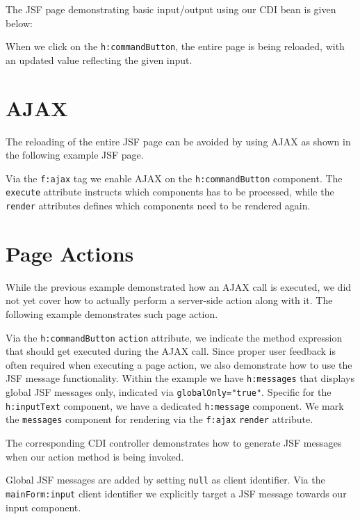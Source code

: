 The JSF page demonstrating basic input/output using our CDI bean is given below:

When we click on the \texttt{h:commandButton}, the entire page is being reloaded, with an updated value reflecting the given input.


\section{AJAX}

The reloading of the entire JSF page can be avoided by using AJAX as shown in the following example JSF page.

Via the \texttt{f:ajax} tag we enable AJAX on the \texttt{h:commandButton} component.
The \texttt{execute} attribute instructs which components has to be processed, while the \texttt{render} attributes defines which components need to be rendered again.


\section{Page Actions}
While the previous example demonstrated how an AJAX call is executed, we did not yet cover how to actually perform a server-side action along with it.
The following example demonstrates such page action.

Via the \texttt{h:commandButton} \texttt{action} attribute, we indicate the method expression that should get executed during the AJAX call.
Since proper user feedback is often required when executing a page action, we also demonstrate how to use the JSF message functionality.
Within the example we have \texttt{h:messages} that displays global JSF messages only,
indicated via \texttt{globalOnly="true"}.
Specific for the \texttt{h:inputText} component, we have a dedicated \texttt{h:message} component.
We mark the \texttt{messages} component for rendering via the \texttt{f:ajax} \texttt{render} attribute.

The corresponding CDI controller demonstrates how to generate JSF messages when our action method is being invoked.

Global JSF messages are added by setting \texttt{null} as client identifier.
Via the \texttt{mainForm:input} client identifier we explicitly target a JSF message towards our input component.

